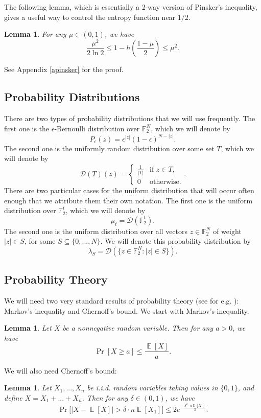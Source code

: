 \documentclass[12pt]{article}
\newtheorem{lemma}[theorem]{Lemma}
\newcommand{\E}{\mathop \mathbb{E}}
\begin{document}
The following lemma, which is essentially a 2-way version of Pinsker's inequality, gives a useful way to control the entropy function near $1/2$. 
\begin{lemma}\label{pinsker}
For any $\mu\in(0,1)$, we have $$\frac{\mu^2}{2\ln2}\leq1-h\left(\frac{1-\mu}{2}\right)\leq\mu^2.$$
\end{lemma}
See Appendix \ref{apinsker} for the proof.

\subsection{Probability Distributions}
There are two types of probability distributions that we will use frequently. The first one is the $\epsilon$-Bernoulli distribution over $\mathbb{F}_2^N$, which we will denote by
$$P_\epsilon (z)=\epsilon^{|z|}(1-\epsilon)^{N-|z|}.$$
The second one is the uniformly random distribution over some set $T$, which we will denote by
$$\mathcal{D}(T)(z)=\begin{cases}
\frac{1}{|T|} & \text{if $z\in T$,}\\
0 & \text{otherwise.}
\end{cases}.$$
There are two particular cases for the uniform distribution that will occur often enough that we attribute them their own notation. The first one is the uniform distribution over $\mathbb{F}_2^t$, which we will denote by
$$\mu_t=\mathcal{D}(\mathbb{F}_2^t).$$
The second one is the uniform distribution over all vectors $z\in\mathbb{F}_2^N$ of weight $|z|\in S$, for some $S\subseteq\{0,...,N\}$. We will denote this probability distribution by 
$$\lambda_{S}=\mathcal{D}(\{z\in\mathbb{F}_2^N:|z|\in S\}).$$
 
\subsection{Probability Theory} 
We will need two very standard results of probability theory (see for e.g. \cite{theorybook}): Markov's inequality and Chernoff's bound. We start with Markov's inequality.
\begin{lemma}\label{markov}
Let $X$ be a nonnegative random variable. Then for any $a>0$, we have
$$\Pr[X\geq a]\leq \frac{\E[X]}{a}.$$
\end{lemma}
 We will also need Chernoff's bound:
 \begin{lemma}\label{chernoff}
 Let $X_1,...,X_n$ be i.i.d. random variables taking values in $\{0,1\}$, and define $X=X_1+...+X_n$. Then for any $\delta\in (0,1)$, we have
 $$\Pr\Big[\big|X-\E[X]\big|>\delta\cdot n \E[X_1]\Big]\leq 2e^{-\frac{\delta^2 \cdot n\E[X_1]}{3}}.$$
 \end{lemma}
\end{document}
